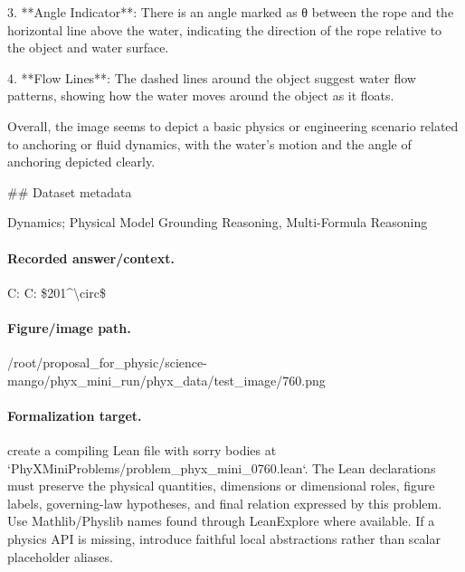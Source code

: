 3. **Angle Indicator**: There is an angle marked as θ between the rope and the horizontal line above the water, indicating the direction of the rope relative to the object and water surface.

4. **Flow Lines**: The dashed lines around the object suggest water flow patterns, showing how the water moves around the object as it floats.

Overall, the image seems to depict a basic physics or engineering scenario related to anchoring or fluid dynamics, with the water's motion and the angle of anchoring depicted clearly.

\#\# Dataset metadata

Dynamics; Physical Model Grounding Reasoning, Multi-Formula Reasoning

\paragraph{Recorded answer/context.}
C: C: \$201\textasciicircum{}\textbackslash{}circ\$

\paragraph{Figure/image path.}
/root/proposal\_for\_physic/science-mango/phyx\_mini\_run/phyx\_data/test\_image/760.png

\paragraph{Formalization target.}
create a compiling Lean file with sorry bodies at `PhyXMiniProblems/problem\_phyx\_mini\_0760.lean`. The Lean declarations must preserve the physical quantities, dimensions or dimensional roles, figure labels, governing-law hypotheses, and final relation expressed by this problem.
Use Mathlib/Physlib names found through LeanExplore where available. If a physics API is missing, introduce faithful local abstractions rather than scalar placeholder aliases.

